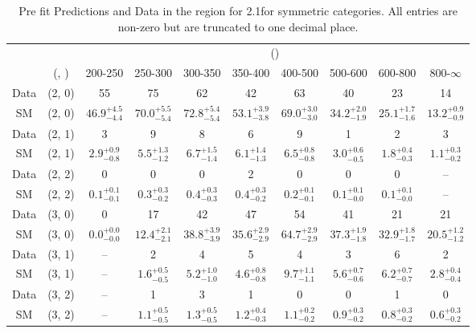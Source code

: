 \begin{table}[h!]
\tiny
\centering
\caption{Pre fit Predictions and Data in the \mmj region for 2.1\ifb for symmetric categories. All entries are non-zero but are truncated to one decimal place.\label{tab:predallqcdnaive_mumu_comb_sym}}
\begin{tabular}
{cccccccccc}
	\hline\hline
	&	& \multicolumn{8}{c}{\scalht (\gev)}\\ 
	&	 (\njet, \nb) & 200-250 & 250-300 & 300-350 & 350-400 & 400-500 & 500-600 & 600-800 & 800-$\infty$ \\ [0.8ex] 
\hline
	Data & (2, 0) & 55 & 75 & 62 & 42 & 63 & 40 & 23 & 14 \\[0.5ex] 
	SM & (2, 0) & $46.9^{+ 4.5 }_{- 4.4 }$ & $70.0^{+ 5.5 }_{- 5.4 }$ & $72.8^{+ 5.4 }_{- 5.4 }$ & $53.1^{+ 3.9 }_{- 3.8 }$ & $69.0^{+ 3.0 }_{- 3.0 }$ & $34.2^{+ 2.0 }_{- 1.9 }$ & $25.1^{+ 1.7 }_{- 1.6 }$ & $13.2^{+ 0.9 }_{- 0.9 }$ \\[0.5ex] 
	Data & (2, 1) & 3 & 9 & 8 & 6 & 9 & 1 & 2 & 3 \\[0.5ex] 
	SM & (2, 1) & $2.9^{+ 0.9 }_{- 0.8 }$ & $5.5^{+ 1.3 }_{- 1.2 }$ & $6.7^{+ 1.5 }_{- 1.4 }$ & $6.1^{+ 1.4 }_{- 1.3 }$ & $6.5^{+ 0.8 }_{- 0.8 }$ & $3.0^{+ 0.6 }_{- 0.5 }$ & $1.8^{+ 0.4 }_{- 0.3 }$ & $1.1^{+ 0.3 }_{- 0.2 }$ \\[0.5ex] 
	Data & (2, 2) & 0 & 0 & 0 & 2 & 0 & 0 & 0 & -- \\[0.5ex] 
	SM & (2, 2) & $0.1^{+ 0.1 }_{- 0.1 }$ & $0.3^{+ 0.3 }_{- 0.2 }$ & $0.4^{+ 0.3 }_{- 0.3 }$ & $0.4^{+ 0.3 }_{- 0.2 }$ & $0.2^{+ 0.1 }_{- 0.1 }$ & $0.1^{+ 0.1 }_{- 0.0 }$ & $0.1^{+ 0.1 }_{- 0.0 }$ & -- \\[0.5ex] 
	Data & (3, 0) & 0 & 17 & 42 & 47 & 54 & 41 & 21 & 21 \\[0.5ex] 
	SM & (3, 0) & $0.0^{+ 0.0 }_{- 0.0 }$ & $12.4^{+ 2.1 }_{- 2.1 }$ & $38.8^{+ 3.9 }_{- 3.9 }$ & $35.6^{+ 2.9 }_{- 2.9 }$ & $64.7^{+ 2.9 }_{- 2.9 }$ & $37.3^{+ 1.9 }_{- 1.8 }$ & $32.9^{+ 1.8 }_{- 1.7 }$ & $20.5^{+ 1.2 }_{- 1.2 }$ \\[0.5ex] 
	Data & (3, 1) & -- & 2 & 4 & 5 & 4 & 3 & 6 & 2 \\[0.5ex] 
	SM & (3, 1) & -- & $1.6^{+ 0.5 }_{- 0.5 }$ & $5.2^{+ 1.0 }_{- 1.0 }$ & $4.6^{+ 0.8 }_{- 0.8 }$ & $9.7^{+ 1.1 }_{- 1.1 }$ & $5.6^{+ 0.7 }_{- 0.6 }$ & $6.2^{+ 0.7 }_{- 0.7 }$ & $2.8^{+ 0.4 }_{- 0.4 }$ \\[0.5ex] 
	Data & (3, 2) & -- & 1 & 3 & 1 & 0 & 0 & 1 & 0 \\[0.5ex] 
	SM & (3, 2) & -- & $1.1^{+ 0.5 }_{- 0.5 }$ & $1.3^{+ 0.5 }_{- 0.5 }$ & $1.2^{+ 0.4 }_{- 0.3 }$ & $1.1^{+ 0.2 }_{- 0.2 }$ & $0.9^{+ 0.3 }_{- 0.2 }$ & $0.8^{+ 0.3 }_{- 0.2 }$ & $0.6^{+ 0.3 }_{- 0.2 }$ \\[0.5ex] 

\end{tabular}
\end{table}

